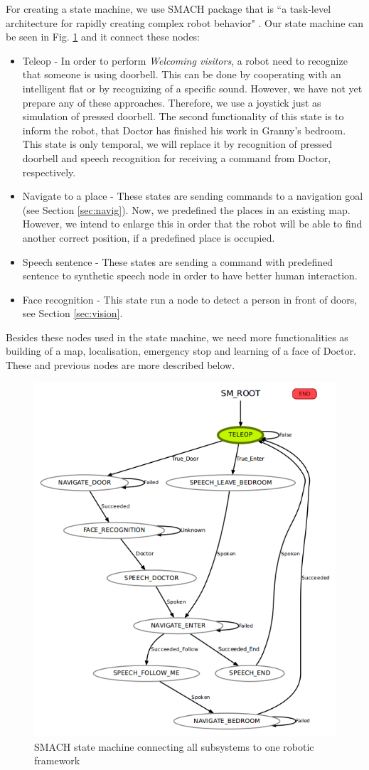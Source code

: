 \documentclass[conference]{IEEEtran}
\begin{document}
For creating a state machine, we use SMACH package that is ``a task-level architecture for rapidly creating complex robot behavior" \cite{smach}. Our state machine can be seen in Fig. \ref{fig:smach} and it connect these nodes:
\begin{itemize}
\item Teleop - In order to perform \textit{Welcoming visitors}, a robot need to recognize that someone is using doorbell. This can be done by cooperating with an intelligent flat or by recognizing of a specific sound. However, we have not yet prepare any of these approaches. Therefore, we use a joystick just as simulation of pressed doorbell. 
The second functionality of this state is to inform the robot, that Doctor has finished his work in Granny's bedroom. This state is only temporal, we will replace it by recognition of pressed doorbell and speech recognition for receiving a command from Doctor, respectively.
\item Navigate to a place - These states are sending commands to a navigation goal (see Section \ref{sec:navig}). Now, we predefined the places in an existing map. However, we intend to enlarge this in order that the robot will be able to find another correct position, if a predefined place is occupied.
\item Speech sentence - These states are sending a command with predefined sentence to synthetic speech node in order to have better human interaction.
\item Face recognition - This state run a node to detect a person in front of doors, see Section \ref{sec:vision}.
\end{itemize}

Besides these nodes used in the state machine, we need more functionalities as building of a map, localisation, emergency stop and learning of a face of Doctor. These and previous nodes are more described below.

\begin{figure}[!htb]
\centering
\includegraphics[width=3.in]{state_machine.png}
\caption{SMACH state machine connecting all subsystems to one robotic framework}
\label{fig:smach}
\end{figure}
\end{document}
